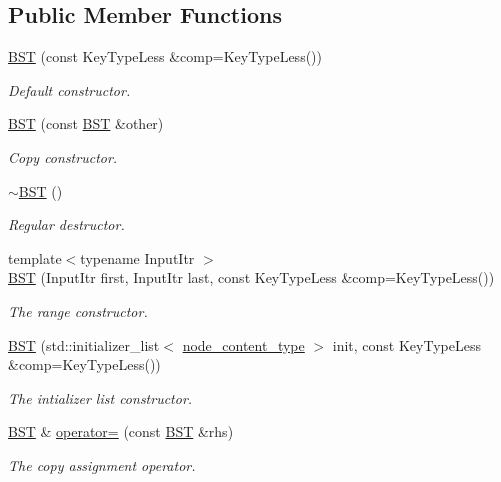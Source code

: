 \subsection*{Public Member Functions}
\begin{DoxyCompactItemize}
\item 
\hyperlink{class_b_s_t_a092e33c1b889b35fb95afda49ca1191c}{B\+ST} (const Key\+Type\+Less \&comp=Key\+Type\+Less())
\begin{DoxyCompactList}\small\item\em Default constructor. \end{DoxyCompactList}\item 
\hyperlink{class_b_s_t_a9c3d9ab6deb17f9dc3fa19d01a46f8e3}{B\+ST} (const \hyperlink{class_b_s_t}{B\+ST} \&other)
\begin{DoxyCompactList}\small\item\em Copy constructor. \end{DoxyCompactList}\item 
\hyperlink{class_b_s_t_a99b5f3bb6438a7cdba827dc77d1d4ce5}{$\sim$\+B\+ST} ()
\begin{DoxyCompactList}\small\item\em Regular destructor. \end{DoxyCompactList}\item 
{\footnotesize template$<$typename Input\+Itr $>$ }\\\hyperlink{class_b_s_t_a8811bb87594111984e2ae68a88586af2}{B\+ST} (Input\+Itr first, Input\+Itr last, const Key\+Type\+Less \&comp=Key\+Type\+Less())
\begin{DoxyCompactList}\small\item\em The range constructor. \end{DoxyCompactList}\item 
\hyperlink{class_b_s_t_ab07b4e6d6818494bbc892df89ee4daad}{B\+ST} (std\+::initializer\+\_\+list$<$ \hyperlink{class_b_s_t_a0aa9307cbee74945dbbbf659c398d4a1}{node\+\_\+content\+\_\+type} $>$ init, const Key\+Type\+Less \&comp=Key\+Type\+Less())
\begin{DoxyCompactList}\small\item\em The intializer list constructor. \end{DoxyCompactList}\item 
\hyperlink{class_b_s_t}{B\+ST} \& \hyperlink{class_b_s_t_a777c36ccd3b24f144e0603f20f5eac9d}{operator=} (const \hyperlink{class_b_s_t}{B\+ST} \&rhs)
\begin{DoxyCompactList}\small\item\em The copy assignment operator. \end{DoxyCompactList}\item 

\end{DoxyCompactItemize}
